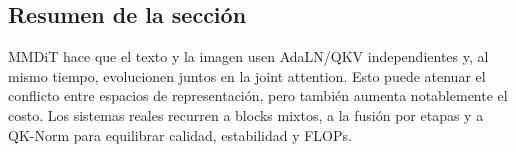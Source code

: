 \subsection{Resumen de la sección}

MMDiT hace que el texto y la imagen usen AdaLN/QKV independientes y, al mismo tiempo, evolucionen juntos en la joint attention. Esto puede atenuar el conflicto entre espacios de representación, pero también aumenta notablemente el costo. Los sistemas reales recurren a blocks mixtos, a la fusión por etapas y a QK-Norm para equilibrar calidad, estabilidad y FLOPs.
